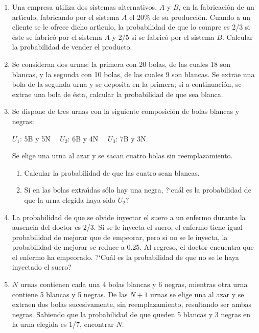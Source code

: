 \documentclass[11pt]{book}
\begin{document}
\begin{enumerate}
\item Una empresa utiliza dos sistemas alternativos, $A$ y $B$, en  la  fabricaci{\'o}n
    de un art{\'\i}culo, fabricando  por el sistema $A$    el  20\%  de  su  producci{\'o}n.
    Cuando a un cliente se le ofrece dicho art{\'\i}culo, la probabilidad de que
    lo compre es 2/3 si {\'e}ste se fabric{\'o} por el sistema $A$  y   2/5  si  se
    fabric{\'o} por  el  sistema  $B$.  Calcular  la  probabilidad  de  vender  el
    producto.



\item Se consideran dos urnas: la primera con 20 bolas, de las cuales  18
    son blancas, y  la segunda con 10 bolas, de las cuales  9  son  blancas.  Se
    extrae una bola de la segunda urna y  se  deposita  en  la  primera; si   a
    continuaci{\'o}n, se extrae una bola de {\'e}sta,  calcular  la  probabilidad  de
    que sea blanca.


\item Se dispone de tres  urnas con  la siguiente  composici{\'o}n de bolas blancas y negras:

    \hskip 2cm $U_{1}$: 5B y 5N $\ \ \ $ $U_{2}$: 6B y 4N  $\ \ \ $
    $U_{3}$: 7B y 3N.

    Se elige  una urna al azar y se sacan  cuatro  bolas sin reemplazamiento.
    \begin{enumerate}
      \item Calcular la probabilidad de que las cuatro sean blancas.
      \item Si en las  bolas extra{\'\i}das s{\'o}lo hay una negra, ?`cu{\'a}l es la probabilidad de que la urna elegida haya sido $U_{2}$?
    \end{enumerate}

\item  La probabilidad de que se olvide inyectar el suero a un enfermo  durante
    la ausencia del doctor es 2/3. Si se le inyecta el suero, el  enfermo
    tiene igual probabilidad de mejorar que de empeorar, pero si no se le inyecta, la probabilidad de mejorar se reduce a  0.25.
    Al regreso, el  doctor
     encuentra que el enfermo ha empeorado. ?`Cu{\'a}l es la  probabilidad
    de que no se le haya inyectado el  suero?

\item $N$ urnas contienen cada una 4 bolas blancas y 6  negras,  mientras  otra
    urna contiene 5 blancas y 5 negras. De las $N+1$ urnas se  elige  una  al
    azar y se  extraen  dos  bolas  sucesivamente, sin  reemplazamiento,
    resultando ser ambas  negras. Sabiendo  que  la  probabilidad  de  que
    queden 5 blancas y 3 negras en la urna elegida es 1/7, encontrar $N$.



\end{enumerate}
\end{document}
